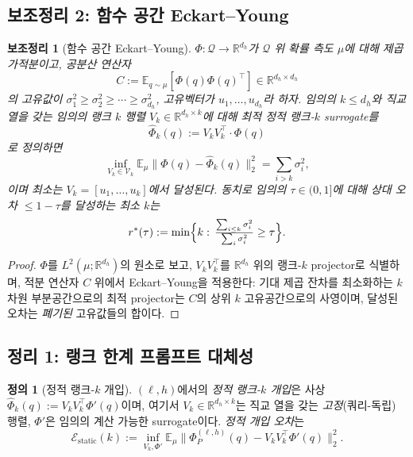 \documentclass{article}
\newtheorem{lemma}{보조정리}
\theoremstyle{definition}
\newtheorem{definition}{정의}
\newcommand{\R}{\mathbb{R}}
\newcommand{\E}{\mathbb{E}}
\newcommand{\Phip}{\Phi_P}
\newcommand{\dh}{d_h}
\begin{document}
\subsection{보조정리 2: 함수 공간 Eckart--Young}
\label{sec:lemma2}

\begin{lemma}[함수 공간 Eckart--Young]
\label{lem:eckart-young}
$\Phi: \mathcal{Q} \to \R^{\dh}$가 $\mathcal{Q}$ 위 확률 측도 $\mu$에 대해 제곱 가적분이고, 공분산 연산자
\[
C := \E_{q\sim\mu}[\Phi(q)\Phi(q)^\top] \in \R^{\dh\times \dh}
\]
의 고유값이 $\sigma_1^2 \ge \sigma_2^2 \ge \cdots \ge \sigma_{\dh}^2$, 고유벡터가 $u_1, \dots, u_{\dh}$라 하자. 임의의 $k\le\dh$와 직교 열을 갖는 임의의 랭크 $k$ 행렬 $V_k \in \R^{\dh\times k}$에 대해 최적 정적 랭크-$k$ surrogate를
\[
\widehat{\Phi}_k(q) := V_k V_k^\top \cdot \Phi(q)
\]
로 정의하면
\begin{equation}
\inf_{V_k\in \mathcal{V}_k} \E_\mu \bigl\| \Phi(q) - \widehat{\Phi}_k(q)\bigr\|_2^2 = \sum_{i>k}\sigma_i^2,
\end{equation}
이며 최소는 $V_k = [u_1, \dots, u_k]$에서 달성된다. 동치로 임의의 $\tau \in (0,1]$에 대해 상대 오차 $\le 1-\tau$를 달성하는 최소 $k$는
\begin{equation}
r^*(\tau) := \min\Bigl\{k:\, \tfrac{\sum_{i\le k}\sigma_i^2}{\sum_{i}\sigma_i^2}\ge \tau\Bigr\}.
\end{equation}
\end{lemma}

\begin{proof}
$\Phi$를 $L^2(\mu;\R^{\dh})$의 원소로 보고, $V_k V_k^\top$를 $\R^{\dh}$ 위의 랭크-$k$ projector로 식별하며, 적분 연산자 $C$ 위에서 Eckart--Young을 적용한다: 기대 제곱 잔차를 최소화하는 $k$차원 부분공간으로의 최적 projector는 $C$의 상위 $k$ 고유공간으로의 사영이며, 달성된 오차는 \emph{폐기된} 고유값들의 합이다.
\end{proof}

\subsection{정리 1: 랭크 한계 프롬프트 대체성}
\label{sec:thm1}

\begin{definition}[정적 랭크-$k$ 개입]
$(\ell,h)$에서의 \emph{정적 랭크-$k$ 개입}은 사상 $\widehat{\Phi}_k(q) := V_k V_k^\top \Phi'(q)$이며, 여기서 $V_k \in \R^{\dh\times k}$는 직교 열을 갖는 \emph{고정}(쿼리-독립) 행렬, $\Phi'$은 임의의 계산 가능한 surrogate이다. \emph{정적 개입 오차}는
\[
\mathcal{E}_{\mathrm{static}}(k) := \inf_{V_k, \Phi'} \E_\mu \bigl\| \Phip^{(\ell,h)}(q) - V_k V_k^\top \Phi'(q)\bigr\|_2^2.
\]
\end{definition}
\end{document}
